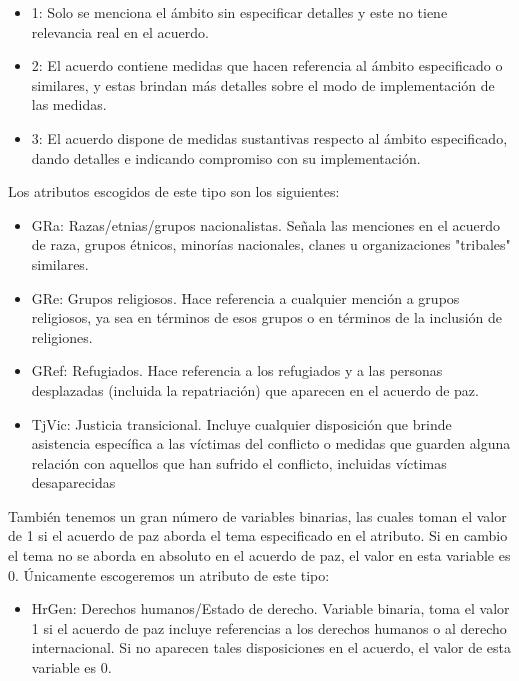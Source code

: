 \documentclass[11pt]{article}
\providecommand{\tightlist}{%
      \setlength{\itemsep}{0pt}\setlength{\parskip}{0pt}}
\begin{document}
\begin{itemize}
\tightlist
\item
  1: Solo se menciona el ámbito sin especificar detalles y este no tiene
  relevancia real en el acuerdo.
\item
  2: El acuerdo contiene medidas que hacen referencia al ámbito
  especificado o similares, y estas brindan más detalles sobre el modo
  de implementación de las medidas.
\item
  3: El acuerdo dispone de medidas sustantivas respecto
  al ámbito especificado, dando detalles e indicando compromiso con su
  implementación.
\end{itemize}

Los atributos escogidos de este tipo son los siguientes:

\begin{itemize}
\item
  GRa: Razas/etnias/grupos nacionalistas. Señala las menciones en el
  acuerdo de raza, grupos étnicos, minorías nacionales, clanes u
  organizaciones "tribales" similares.
\item
  GRe: Grupos religiosos. Hace referencia a cualquier mención a grupos
  religiosos, ya sea en términos de esos grupos o en términos de la
  inclusión de religiones. ~
\item
  GRef: Refugiados. Hace referencia a los refugiados y a las personas
  desplazadas (incluida la repatriación) que aparecen en el acuerdo de
  paz.
\item
  TjVic: Justicia transicional. Incluye cualquier disposición que brinde
  asistencia específica a las víctimas del conflicto o medidas que guarden alguna relación con aquellos que han sufrido el conflicto, incluidas víctimas desaparecidas
\end{itemize}

También tenemos un gran número de variables binarias, las cuales toman
el valor de 1 si el acuerdo de paz aborda el tema especificado en el
atributo. Si en cambio el tema no se aborda en absoluto en el acuerdo
de paz, el valor en esta variable es 0. Únicamente escogeremos un atributo de este tipo:

\begin{itemize}
\item
  HrGen: Derechos humanos/Estado de derecho. Variable binaria, toma el
  valor 1 si el acuerdo de paz incluye referencias a los derechos
  humanos o al derecho internacional. Si no aparecen tales disposiciones
  en el acuerdo, el valor de esta variable es 0.
\end{itemize}
\end{document}
